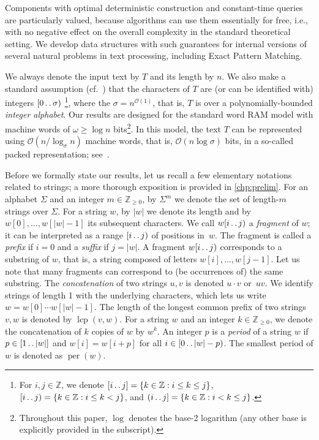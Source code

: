 \documentclass[a4paper]{article}
\theoremstyle{definition}
\theoremstyle{remark}
\newcommand{\Zz}{\mathbb{Z}_{\ge 0}}
\newcommand{\integ}{\mathbb{Z}}
\newcommand{\lcp}{\operatorname{lcp}}
\newcommand{\dd}{\mathinner{\ldotp\ldotp}}
\DeclareMathOperator{\per}{per}
\newcommand{\Oh}{\mathcal{O}}
\begin{document}
Components with optimal deterministic construction and constant-time queries are particularly valued,
because algorithms can use them essentially for free,
i.e., with no negative effect on the overall complexity in the standard theoretical setting.
We develop data structures with such guarantees for internal versions of several natural problems in text processing, including Exact Pattern Matching.

We always denote the input text by $T$ and its length by $n$.
We also make a standard assumption (cf.\ \cite{DBLP:journals/jacm/Farach-ColtonFM00}) that the characters of $T$ are (or can be identified with) integers $[0\dd \sigma)$
\footnote{ For $i,j\in \integ$, we
denote $[i\dd j]=\{k \in \integ : i \le k \le j\}$, $[i\dd j)=\{k \in \integ : i \le k < j\}$, and $(i\dd j]={\{k \in \integ: i < k \le j\}}$. },
where the $\sigma = n^{\Oh(1)}$, that is, $T$ is over a polynomially-bounded \emph{integer alphabet}.
Our results are designed for the standard word RAM model with machine words of $\omega \ge \log n$ bits\footnote{Throughout this paper, $\log$ denotes the base-2 logarithm (any other base is explicitly provided in the subscript).}.
In this model, the text $T$ can be represented using $\Oh(n/\log_\sigma n)$ machine words, that is, $\Oh(n \log \sigma)$ bits, in a
so-called packed representation; see~\cite{DBLP:journals/tcs/Ben-KikiBBGGW14}.

Before we formally state our results, let us recall a few elementary notations related to strings;
a more thorough exposition is provided in \cref{chp:prelim}.
For an alphabet $\Sigma$ and an integer $m \in \Zz$, by $\Sigma^m$ we denote the set of length-$m$ strings over $\Sigma$.
For a string $w$, by $|w|$ we denote its length and by $w[0],\ldots,w[|w|-1]$ its subsequent characters.
We call $w[i \dd j)$ a \emph{fragment} of $w$; it can be interpreted as a range $[i \dd j)$ of positions in~$w$.
The fragment is called a \emph{prefix} if $i=0$ and a \emph{suffix} if $j=|w|$.
A fragment $w[i \dd j)$ corresponds to a substring of $w$, that is, a string composed of letters $w[i],\ldots,w[j-1]$.
Let us note that many fragments can correspond to (be occurrences of) the same substring.
The \emph{concatenation} of two strings $u,v$ is denoted $u\cdot v$ or~$uv$.
We identify strings of length 1 with the underlying characters, which lets us write $w=w[0]\cdots w[|w|-1]$.
The length of the longest common prefix of two strings $v,w$ is denoted by $\lcp(v,w)$.
For a string $w$ and an integer $k\in \Zz$, we denote the concatenation of $k$ copies of $w$ by $w^k$.
An integer $p$ is a \emph{period} of a string $w$ if $p \in [1 \dd |w|]$ and $w[i]=w[i+p]$ for all $i \in [0 \dd |w|-p)$.
The smallest period of $w$ is denoted as $\per(w)$.
\end{document}
